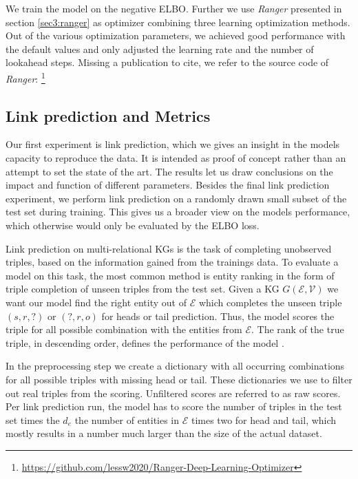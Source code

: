 We train the model on the negative ELBO. Further we use \textit{Ranger} presented in section \ref{sec3:ranger} as optimizer combining three learning optimization methods. Out of the various optimization parameters, we achieved good performance with the default values and  only adjusted the learning rate and the number of lookahead steps. Missing a publication to cite, we refer to the source code of \textit{Ranger}: \footnote{\url{https://github.com/lessw2020/Ranger-Deep-Learning-Optimizer}}



\subsection{Link prediction and Metrics}
\label{ssec4:lpmetrics}
Our first experiment is link prediction, which we gives an insight in the models capacity to reproduce the data. It is intended as proof of concept rather than an attempt to set the state of the art. The results let us draw conclusions on the impact and function of different parameters.
Besides the final link prediction experiment, we perform link prediction on a randomly drawn small subset of the test set during training. This gives us a broader view on the models performance, which otherwise would only be evaluated by the ELBO loss.  

Link prediction on multi-relational KGs is the task of completing unobserved triples, based on the information gained from the trainings data. To evaluate a model on this task, the most common method is entity ranking in the form of triple completion of unseen triples from the test set. Given a KG $G(\mathcal{E},\mathcal{V})$ we want our model find the right entity out of $\mathcal{E}$ which completes the unseen triple $(s,r,?)$ or $(?,r,o)$ for heads or tail prediction. Thus, the model scores the triple for all possible combination with the entities from $\mathcal{E}$. The rank of the true triple, in descending order, defines the performance of the model \cite{ruffinelli_you_2019}.

In the preprocessing step we create a dictionary with all occurring combinations for all possible triples with missing head or tail. These dictionaries we use to filter out real triples from the scoring. Unfiltered scores are referred to as raw scores. Per link prediction run, the model has to score the number of triples in the test set times the $d_e$ the number of entities in $\mathcal{E}$ times two for head and tail, which mostly results in a number much larger than the size of the actual dataset.

